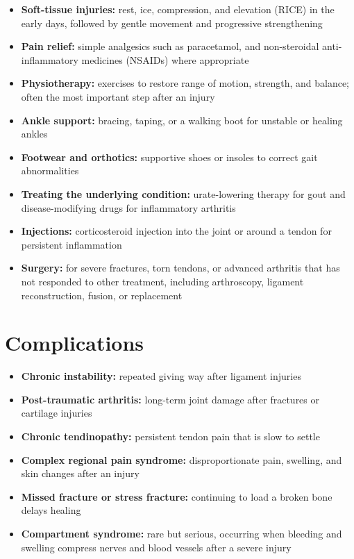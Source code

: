 \begin{itemize}
    \item \textbf{Soft-tissue injuries:} rest, ice, compression, and elevation (RICE) in the early days, followed by gentle movement and progressive strengthening
    \item \textbf{Pain relief:} simple analgesics such as paracetamol, and non-steroidal anti-inflammatory medicines (NSAIDs) where appropriate
    \item \textbf{Physiotherapy:} exercises to restore range of motion, strength, and balance; often the most important step after an injury
    \item \textbf{Ankle support:} bracing, taping, or a walking boot for unstable or healing ankles
    \item \textbf{Footwear and orthotics:} supportive shoes or insoles to correct gait abnormalities
    \item \textbf{Treating the underlying condition:} urate-lowering therapy for gout and disease-modifying drugs for inflammatory arthritis
    \item \textbf{Injections:} corticosteroid injection into the joint or around a tendon for persistent inflammation
    \item \textbf{Surgery:} for severe fractures, torn tendons, or advanced arthritis that has not responded to other treatment, including arthroscopy, ligament reconstruction, fusion, or replacement
\end{itemize}

\section*{Complications}
\begin{itemize}
    \item \textbf{Chronic instability:} repeated giving way after ligament injuries
    \item \textbf{Post-traumatic arthritis:} long-term joint damage after fractures or cartilage injuries
    \item \textbf{Chronic tendinopathy:} persistent tendon pain that is slow to settle
    \item \textbf{Complex regional pain syndrome:} disproportionate pain, swelling, and skin changes after an injury
    \item \textbf{Missed fracture or stress fracture:} continuing to load a broken bone delays healing
    \item \textbf{Compartment syndrome:} rare but serious, occurring when bleeding and swelling compress nerves and blood vessels after a severe injury
\end{itemize}

